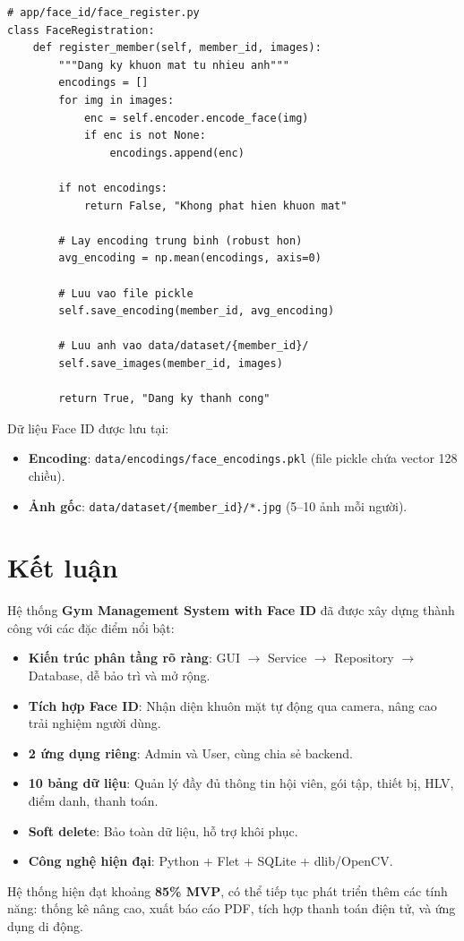 \documentclass[12pt,a4paper]{article}
\begin{document}
\begin{lstlisting}[style=pythonstyle, caption={Đăng ký khuôn mặt cho hội viên}]
# app/face_id/face_register.py
class FaceRegistration:
    def register_member(self, member_id, images):
        """Dang ky khuon mat tu nhieu anh"""
        encodings = []
        for img in images:
            enc = self.encoder.encode_face(img)
            if enc is not None:
                encodings.append(enc)

        if not encodings:
            return False, "Khong phat hien khuon mat"

        # Lay encoding trung binh (robust hon)
        avg_encoding = np.mean(encodings, axis=0)

        # Luu vao file pickle
        self.save_encoding(member_id, avg_encoding)

        # Luu anh vao data/dataset/{member_id}/
        self.save_images(member_id, images)

        return True, "Dang ky thanh cong"
\end{lstlisting}

Dữ liệu Face ID được lưu tại:
\begin{itemize}[leftmargin=2cm]
	\item \textbf{Encoding}: \texttt{data/encodings/face\_encodings.pkl} (file pickle chứa vector 128 chiều).
	\item \textbf{Ảnh gốc}: \texttt{data/dataset/\{member\_id\}/*.jpg} (5--10 ảnh mỗi người).
\end{itemize}

\section*{Kết luận}

Hệ thống \textbf{Gym Management System with Face ID} đã được xây dựng thành công với các đặc điểm nổi bật:

\begin{itemize}[leftmargin=2cm]
	\item \textbf{Kiến trúc phân tầng rõ ràng}: GUI $\rightarrow$ Service $\rightarrow$ Repository $\rightarrow$ Database, dễ bảo trì và mở rộng.
	\item \textbf{Tích hợp Face ID}: Nhận diện khuôn mặt tự động qua camera, nâng cao trải nghiệm người dùng.
	\item \textbf{2 ứng dụng riêng}: Admin và User, cùng chia sẻ backend.
	\item \textbf{10 bảng dữ liệu}: Quản lý đầy đủ thông tin hội viên, gói tập, thiết bị, HLV, điểm danh, thanh toán.
	\item \textbf{Soft delete}: Bảo toàn dữ liệu, hỗ trợ khôi phục.
	\item \textbf{Công nghệ hiện đại}: Python + Flet + SQLite + dlib/OpenCV.
\end{itemize}

Hệ thống hiện đạt khoảng \textbf{85\% MVP}, có thể tiếp tục phát triển thêm các tính năng: thống kê nâng cao, xuất báo cáo PDF, tích hợp thanh toán điện tử, và ứng dụng di động.
\end{document}
